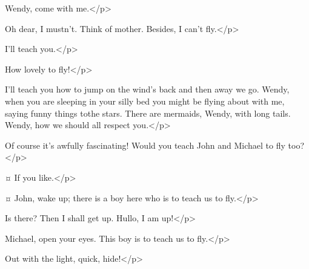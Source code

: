\peterspeaks
Wendy, come with me.</p>

\wendyspeaks
Oh dear, I mustn't.
Think of mother.
Besides, I can't fly.</p>

\peterspeaks
I'll teach you.</p>

\wendyspeaks
How lovely to fly!</p>

\peterspeaks
I'll teach you how to jump on the wind's back and then away we go.
Wendy, when you are sleeping in your silly bed you might be flying about with me, saying funny things tothe stars.
There are mermaids, Wendy, with long tails.
Wendy, how we should all respect you.</p>


\wendyspeaks
Of course it's awfully fascinating!
Would you teach John and Michael to fly too?</p>

\peterspeaks {}¤
If you like.</p>

\wendyspeaks {}¤
John, wake up; there is a boy here who is to teach us to fly.</p>

\johnspeaks
Is there?
Then I shall get up.
Hullo, I am up!</p>

\wendyspeaks
Michael, open your eyes.
This boy is to teach us to fly.</p>


\johnspeaks
Out with the light, quick, hide!</p>



